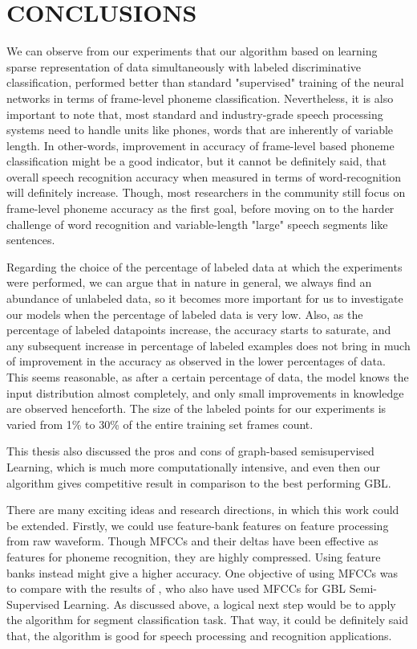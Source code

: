 \section{CONCLUSIONS}
\label{sec:conclusions}

We can observe from our experiments that our algorithm based on learning sparse representation of data simultaneously with labeled discriminative classification, performed better than standard "supervised" training of the neural networks in terms of frame-level phoneme classification. Nevertheless, it is also important to note that, most standard and industry-grade speech processing systems need to handle units like phones, words that are inherently of variable length. In other-words, improvement in accuracy of frame-level based phoneme classification might be a good indicator, but it cannot be definitely said, that overall speech recognition accuracy when measured in terms of word-recognition will definitely increase. Though, most researchers in the community still focus on frame-level phoneme accuracy as the first goal, before moving on to the harder challenge of word recognition and variable-length "large" speech segments like sentences. 

Regarding the choice of the percentage of labeled data at which the experiments were performed, we can argue that in nature in general, we always find an abundance of unlabeled data, so it becomes more important for us to investigate our models when the percentage of labeled data is very low. Also, as the percentage of labeled datapoints increase, the accuracy starts to saturate, and any subsequent increase in percentage of labeled examples does not bring in much of improvement in the accuracy as observed in the lower percentages of data. This seems reasonable, as after a certain percentage of data, the model knows the input distribution almost completely, and only small improvements in knowledge are observed henceforth. The size of the labeled points for our experiments is varied from 1\% to 30\% of the entire training set frames count.

This thesis also discussed the pros and cons of graph-based semisupervised Learning, which is much more computationally intensive, and even then our algorithm gives competitive result in comparison to the best performing GBL.

There are many exciting ideas and research directions, in which this work could be extended. Firstly, we could use feature-bank features on feature processing from raw waveform. Though MFCCs and their deltas have been effective as features for phoneme recognition, they are highly compressed. Using feature banks instead might give a higher accuracy. One objective of using MFCCs was to compare with the results of \cite{liu-2013}, who also have used MFCCs for GBL Semi-Supervised Learning. As discussed above, a logical next step would be to apply the algorithm for segment classification task. That way, it could be definitely said that, the algorithm is good for speech processing and recognition applications. 

